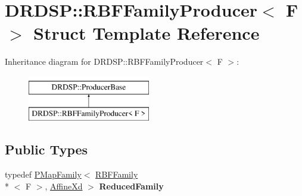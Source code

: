 \hypertarget{struct_d_r_d_s_p_1_1_r_b_f_family_producer}{\section{D\-R\-D\-S\-P\-:\-:R\-B\-F\-Family\-Producer$<$ F $>$ Struct Template Reference}
\label{struct_d_r_d_s_p_1_1_r_b_f_family_producer}
}
Inheritance diagram for D\-R\-D\-S\-P\-:\-:R\-B\-F\-Family\-Producer$<$ F $>$\-:\begin{figure}[H]
\begin{center}
\leavevmode
\includegraphics[height=2.000000cm]{struct_d_r_d_s_p_1_1_r_b_f_family_producer}
\end{center}
\end{figure}
\subsection*{Public Types}
\begin{DoxyCompactItemize}
\item 
\hypertarget{struct_d_r_d_s_p_1_1_r_b_f_family_producer_adeef9e5c4bb8e84b47d6975b5fd0b9a5}{typedef \hyperlink{struct_d_r_d_s_p_1_1_p_map_family}{P\-Map\-Family}$<$ \hyperlink{struct_d_r_d_s_p_1_1_r_b_f_family}{R\-B\-F\-Family}\\*
$<$ F $>$, \hyperlink{struct_d_r_d_s_p_1_1_affine}{Affine\-Xd} $>$ {\bfseries Reduced\-Family}}\label{struct_d_r_d_s_p_1_1_r_b_f_family_producer_adeef9e5c4bb8e84b47d6975b5fd0b9a5}

\end{DoxyCompactItemize}
